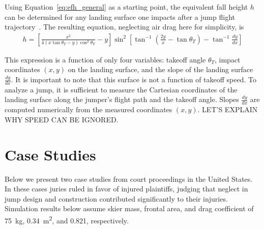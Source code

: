 \documentclass{article}
\begin{document}
Using Equation~\ref{eq:efh_general} as a starting point, the equivalent fall
height $h$ can be determined for any landing surface one impacts after a jump
flight trajectory~\cite{Hubbard2012}. The resulting equation, neglecting
air drag here for simplicity, is
%
\begin{align}
  h = \left[\frac{x^2}{4(x\tan\theta_T - y)\cos^{2}\theta_T} -
    y\right]\sin^{2}\left[\tan^{-1}\left(\frac{2y}{x}- \tan\theta_T\right) - \tan^{-1}\frac{dy}{dx}\right]
  \label{eq:efh}
\end{align}

This expression is  a function of only four variables: takeoff angle $\theta_T$,
impact coordinates $(x,y)$ on the landing surface, and the slope of the landing
surface $\frac{dy}{dx}$. It is important to note that this surface is not a
function of takeoff speed. To analyze a jump, it is sufficient to measure the
Cartesian coordinates of the landing surface along the jumper's flight path and
the takeoff angle. Slopes $\frac{dy}{dx}$ are computed numerically from the measured
coordinates $(x,y)$.  LET'S EXPLAIN WHY SPEED CAN BE IGNORED.

\section{Case Studies}
%
Below we present two case studies from court proceedings in the United States.
In these cases juries ruled in favor of injured plaintiffs,
judging that neglect in jump design and construction 
contributed significantly to their injuries. Simulation results
below assume skier mass, frontal area, and drag coefficient of 75~\si{\kg},
0.34~\si{\meter\squared}, and 0.821, respectively.
\end{document}
